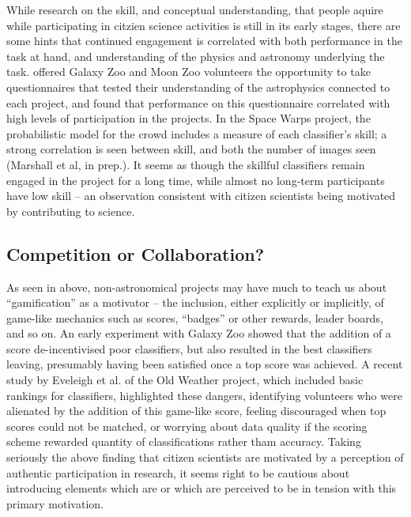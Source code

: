 \documentclass{ar2e}
\begin{document}
While research on the skill, and conceptual understanding, that  people aquire
while participating in citzien science activities is still in its early
stages, there are some hints that continued engagement is correlated with both
performance in the task at hand, and understanding of the physics and
astronomy underlying the task. \citet{Prather++2013} offered Galaxy Zoo and
Moon Zoo volunteers the opportunity to take questionnaires that tested their
understanding of the astrophysics connected to each project, and found that
performance on this questionnaire correlated with high levels of participation
in the projects. In the Space Warps project, the probabilistic model for the
crowd includes a measure of each classifier's skill; a strong correlation is
seen between skill, and both the number of images seen (Marshall et al, in
prep.). It seems as though the skillful classifiers remain engaged in the
project for a long time, while almost no long-term participants have low skill
-- an observation consistent with citizen scientists being motivated by
contributing to science.

\newpage


\subsection{Competition or Collaboration?}
\label{sec:crowd:gamification}

As seen in  above, non-astronomical projects may have
much to teach us about ``gamification'' as a motivator -- the inclusion, either
explicitly or implicitly, of game-like mechanics such as scores, ``badges'' or
other rewards, leader boards, and so on. An early experiment with Galaxy Zoo
showed that the addition of a score de-incentivised poor classifiers, but also
resulted in the best classifiers leaving, presumably having been satisfied once
a top score was achieved. A recent study by Eveleigh et al. of the Old Weather
project, which included basic rankings for classifiers, highlighted these
dangers, identifying volunteers who were alienated by the addition of this
game-like score, feeling discouraged when top scores could not be matched, or
worrying about data quality if the scoring scheme rewarded quantity of
classifications rather tham accuracy. Taking seriously the above finding 
that citizen scientists are motivated by a perception of authentic
participation in research, it seems right to be cautious about introducing
elements which are or which are perceived to be in tension with this primary
motivation. 
\end{document}
